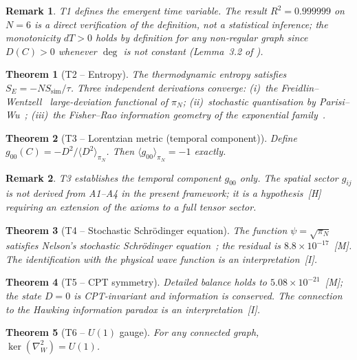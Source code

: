 \documentclass[11pt, a4paper]{article}
\newtheorem{theorem}{Theorem}
\newtheorem{remark}{Remark}
\begin{document}
\begin{remark}
T1 defines the emergent time variable.
The result $R^2=0.999999$ on $N=6$ is a direct verification
of the definition, not a statistical inference; the monotonicity
$dT>0$ holds by definition for any non-regular graph since $D(C)>0$
whenever $\deg$ is not constant (Lemma~3.2 of \cite{BCM1978}).
\end{remark}

\begin{theorem}[T2 – Entropy]
The thermodynamic entropy satisfies $S_E=-NS_{\text{sim}}/\tau$.
Three independent derivations converge:
(i)~the Freidlin–Wentzell~\cite{FreidlinWentzell} large-deviation
functional of $\pi_N$;
(ii)~stochastic quantisation by Parisi–Wu~\cite{ParisiWu};
(iii)~the Fisher–Rao information geometry of the exponential
family~\cite{FisherRao}.
\end{theorem}

\begin{theorem}[T3 – Lorentzian metric (temporal component)]
Define $g_{00}(C)=-D^2/\langle D^2\rangle_{\pi_N}$.
Then $\langle g_{00}\rangle_{\pi_N}=-1$ exactly.
\end{theorem}

\begin{remark}
T3 establishes the temporal component $g_{00}$ only.
The spatial sector $g_{ij}$ is not derived from A1--A4
in the present framework; it is a hypothesis~[H]
requiring an extension of the axioms to a full tensor sector.
\end{remark}

\begin{theorem}[T4 – Stochastic Schr\"odinger equation]
The function $\psi=\sqrt{\pi_N}$ satisfies Nelson's stochastic
Schr\"odinger equation~\cite{Nelson1966};
the residual is $8.8\times10^{-17}$~[M].
The identification with the physical wave function is an
interpretation~[I].
\end{theorem}

\begin{theorem}[T5 – CPT symmetry]
Detailed balance holds to $5.08\times10^{-21}$~[M];
the state $D=0$ is CPT-invariant and information is conserved.
The connection to the Hawking information paradox is an
interpretation~[I].
\end{theorem}

\begin{theorem}[T6 – $U(1)$ gauge]
For any connected graph,
$\ker(\nabla_W^2)=U(1)$.
\end{theorem}
\end{document}
